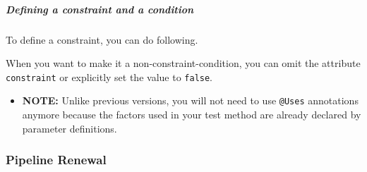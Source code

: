 \subparagraph{Defining a constraint and a
condition}\label{defining-a-constraint-and-a-condition}

To define a constraint, you can do following.

\begin{Shaded}
\begin{Highlighting}[]
        \NormalTok{)}
          \NormalTok{(}
            \NormalTok{(}
            \NormalTok{(}\NormalTok{) } 
            \NormalTok{(}\NormalTok{) } 
            \NormalTok{(}\NormalTok{) } 
        \NormalTok{) \{}
           \NormalTok{;}
        \NormalTok{\}}
\end{Highlighting}
\end{Shaded}

When you want to make it a non-constraint-condition, you can omit the
attribute \texttt{constraint} or explicitly set the value to
\texttt{false}.

\begin{Shaded}
\begin{Highlighting}[]
        \NormalTok{)}
          \NormalTok{(}
\end{Highlighting}
\end{Shaded}

\begin{itemize}
\tightlist
\item
  \textbf{NOTE:} Unlike previous versions, you will not need to use
  \texttt{@Uses} annotations anymore because the factors used in your
  test method are already declared by parameter definitions.
\end{itemize}

\subsubsection{Pipeline Renewal}\label{pipeline-renewal}

